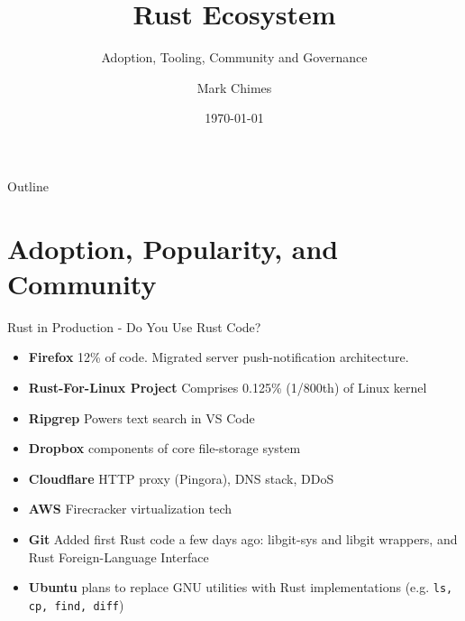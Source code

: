 \documentclass{beamer}
\title{Rust Ecosystem}
\subtitle{Adoption, Tooling, Community and Governance}
\author{Mark Chimes}
\date{\today}
\begin{document}
\begin{frame}
    \titlepage
\end{frame}

\begin{frame}{Outline}
\tableofcontents
\end{frame}

\section{Adoption, Popularity, and Community}

\begin{frame}{Rust in Production - Do You Use Rust Code?} 
\begin{block}{}

\begin{itemize} 
	\item \textbf{Firefox} 
	12\% of code. Migrated server push-notification architecture.
	\item \textbf{Rust-For-Linux Project} 
	Comprises 0.125\% (1/800th) of Linux kernel
	\item \textbf{Ripgrep} 
	Powers text search in VS Code
	\item \textbf{Dropbox}
	components of core file-storage system
	\item \textbf{Cloudflare}
	HTTP proxy (Pingora), DNS stack, DDoS 
	\item \textbf{AWS}
	Firecracker virtualization tech
	\item \textbf{Git} Added first Rust code a few days ago: 
	libgit-sys and libgit wrappers, and Rust Foreign-Language Interface
	\item \textbf{Ubuntu} plans to replace GNU utilities with Rust implementations
	(e.g. \texttt{ls, cp, find, diff})
\end{itemize} 
\end{block}
\end{frame} 
\end{document}
